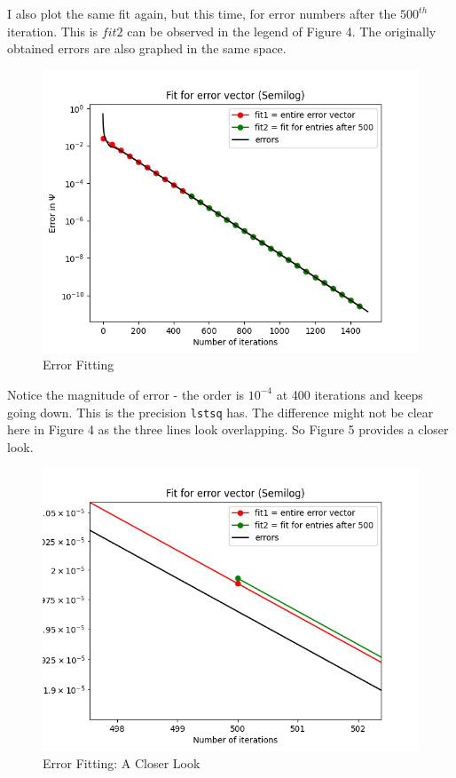 \documentclass[11pt, a4paper]{article}
\begin{document}
I also plot the same fit again, but this time, for error numbers after the $500^{th}$ iteration. This is $fit2$ can be observed in the legend of Figure 4. The originally obtained errors are also graphed in the same space. 

   \begin{figure}[!tbh]
   	\centering
  \includegraphics[scale=0.5]{Q3.png} 
    \caption{Error Fitting}
   	\label{fig:error fitting)}
   \end{figure}
   
Notice the magnitude of error - the order is $10^{-4}$ at 400 iterations and keeps going down. This is the precision \texttt{lstsq} has. The difference might not be clear here in Figure 4 as the three lines look overlapping. So Figure 5 provides a closer look. 

\begin{figure}[!tbh]
   	\centering
  \includegraphics[scale=0.5]{closerlook.png} 
    \caption{Error Fitting: A Closer Look}
   	\label{fig:error fitting 2)}
   \end{figure}
   
\end{document}
